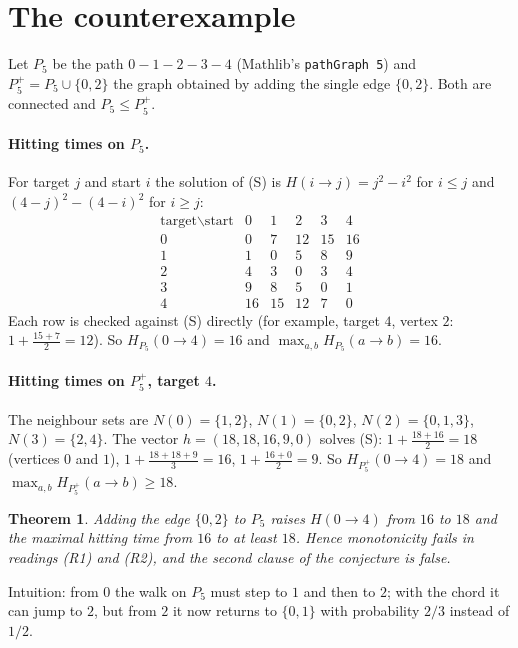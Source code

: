 \documentclass[11pt]{article}
\newtheorem{theorem}{Theorem}
\theoremstyle{definition}
\begin{document}
\section{The counterexample}
Let $P_5$ be the path $0-1-2-3-4$ (Mathlib's \texttt{pathGraph 5}) and $P_5^{+}=P_5\cup\{0,2\}$ the
graph obtained by adding the single edge $\{0,2\}$. Both are connected and $P_5\le P_5^+$.

\paragraph{Hitting times on $P_5$.} For target $j$ and start $i$ the solution of (S) is
$H(i\to j)=j^2-i^2$ for $i\le j$ and $(4-j)^2-(4-i)^2$ for $i\ge j$:
\[\begin{array}{c|ccccc}
 \text{target}\backslash\text{start} & 0&1&2&3&4\\\hline
 0&0&7&12&15&16\\ 1&1&0&5&8&9\\ 2&4&3&0&3&4\\ 3&9&8&5&0&1\\ 4&16&15&12&7&0
\end{array}\]
Each row is checked against (S) directly (for example, target $4$, vertex $2$:
$1+\frac{15+7}{2}=12$). So $H_{P_5}(0\to4)=16$ and $\max_{a,b}H_{P_5}(a\to b)=16$.

\paragraph{Hitting times on $P_5^+$, target $4$.} The neighbour sets are $N(0)=\{1,2\}$,
$N(1)=\{0,2\}$, $N(2)=\{0,1,3\}$, $N(3)=\{2,4\}$. The vector $h=(18,18,16,9,0)$ solves (S):
$1+\frac{18+16}2=18$ (vertices $0$ and $1$), $1+\frac{18+18+9}3=16$, $1+\frac{16+0}2=9$. So
$H_{P_5^+}(0\to4)=18$ and $\max_{a,b}H_{P_5^+}(a\to b)\ge18$.

\begin{theorem}
Adding the edge $\{0,2\}$ to $P_5$ raises $H(0\to4)$ from $16$ to $18$ and the maximal hitting time
from $16$ to at least $18$. Hence monotonicity fails in readings (R1) and (R2), and the second
clause of the conjecture is false.
\end{theorem}
Intuition: from $0$ the walk on $P_5$ must step to $1$ and then to $2$; with the chord it can jump
to $2$, but from $2$ it now returns to $\{0,1\}$ with probability $2/3$ instead of $1/2$.
\end{document}
